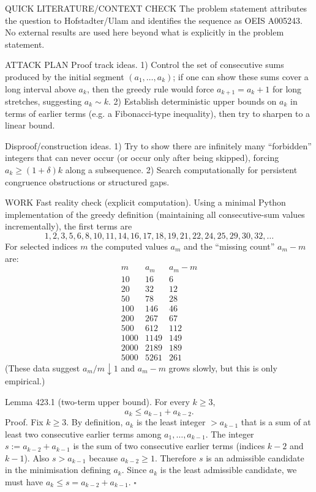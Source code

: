 QUICK LITERATURE/CONTEXT CHECK
The problem statement attributes the question to Hofstadter/Ulam and identifies the sequence as OEIS A005243. No external results are used here beyond what is explicitly in the problem statement.

ATTACK PLAN
Proof track ideas.
1) Control the set of consecutive sums produced by the initial segment $(a_1,\dots,a_{k})$; if one can show these sums cover a long interval above $a_k$, then the greedy rule would force $a_{k+1}=a_k+1$ for long stretches, suggesting $a_k\sim k$.
2) Establish deterministic upper bounds on $a_k$ in terms of earlier terms (e.g. a Fibonacci-type inequality), then try to sharpen to a linear bound.

Disproof/construction ideas.
1) Try to show there are infinitely many “forbidden” integers that can never occur (or occur only after being skipped), forcing $a_k\ge (1+\delta)k$ along a subsequence.
2) Search computationally for persistent congruence obstructions or structured gaps.

WORK
Fast reality check (explicit computation).
Using a minimal Python implementation of the greedy definition (maintaining all consecutive-sum values incrementally), the first terms are
\[
1,2,3,5,6,8,10,11,14,16,17,18,19,21,22,24,25,29,30,32,\dots
\]
For selected indices $m$ the computed values $a_m$ and the “missing count” $a_m-m$ are:
\[
\begin{array}{c|c|c}
 m & a_m & a_m-m\\\hline
10&16&6\\
20&32&12\\
50&78&28\\
100&146&46\\
200&267&67\\
500&612&112\\
1000&1149&149\\
2000&2189&189\\
5000&5261&261
\end{array}
\]
(These data suggest $a_m/m\downarrow 1$ and $a_m-m$ grows slowly, but this is only empirical.)

Lemma 423.1 (two-term upper bound).
For every $k\ge 3$,
\[
 a_k\le a_{k-1}+a_{k-2}.
\]
Proof.
Fix $k\ge 3$. By definition, $a_k$ is the least integer $>a_{k-1}$ that is a sum of at least two consecutive earlier terms among $a_1,\dots,a_{k-1}$.
The integer $s:=a_{k-2}+a_{k-1}$ is the sum of two consecutive earlier terms (indices $k-2$ and $k-1$). Also $s>a_{k-1}$ because $a_{k-2}\ge 1$.
Therefore $s$ is an admissible candidate in the minimisation defining $a_k$. Since $a_k$ is the least admissible candidate, we must have $a_k\le s=a_{k-2}+a_{k-1}$.
\hfill $\square$

